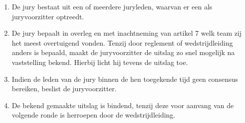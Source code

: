 
\begin{enumerate}
\item De jury bestaat uit een of meerdere juryleden, waarvan er een als juryvoorzitter optreedt.
\item De jury bepaalt in overleg en met inachtneming van artikel 7 welk team zij het meest overtuigend vonden. Tenzij door reglement of wedstrijdleiding anders is bepaald, maakt de juryvoorzitter de uitslag zo snel mogelijk na vaststelling bekend. Hierbij licht hij tevens de uitslag toe.
\item Indien de leden van de jury binnen de hen toegekende tijd geen consensus bereiken, beslist de juryvoorzitter.
\item De bekend gemaakte uitslag is bindend, tenzij deze voor aanvang van de volgende ronde is herroepen door de wedstrijdleiding. 
\end{enumerate}